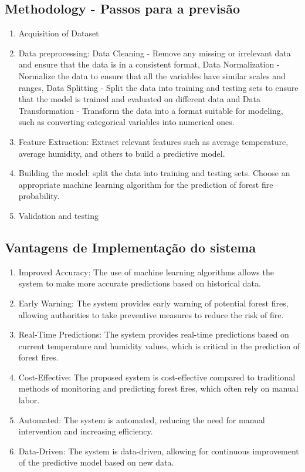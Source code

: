 \documentclass{article}
\begin{document}
\subsection{Methodology - Passos para a previsão}
\begin{enumerate}
\item Acquisition of Dataset
\item Data preprocessing: Data Cleaning - Remove any missing or irrelevant data and ensure that the data is in a consistent format, Data Normalization - Normalize the data to ensure that all the variables have similar scales and ranges, Data Splitting - Split the data into training and testing sets to ensure that the model is trained and evaluated on different data and Data Transformation - Transform the data into a format suitable for modeling, such as converting categorical variables into numerical ones.
\item Feature Extraction: Extract relevant features such as average temperature, average humidity, and others to build a predictive model.
\item Building the model: split the data into training and testing sets. Choose an appropriate machine learning
algorithm for the prediction of forest fire probability.
\item Validation and testing
\end{enumerate}

\subsection{Vantagens de Implementação do sistema}
\begin{enumerate}
    \item Improved Accuracy: The use of machine learning algorithms allows the system to make more accurate predictions based on historical data.
    \item Early Warning: The system provides early warning of potential forest fires, allowing authorities to take preventive measures to reduce the risk of fire.
    \item Real-Time Predictions: The system provides real-time predictions based on current temperature and humidity values, which is critical in the prediction of forest fires.
    \item Cost-Effective: The proposed system is cost-effective compared to traditional methods of monitoring and predicting forest fires, which often rely on manual labor.
    \item Automated: The system is automated, reducing the need for manual intervention and increasing efficiency.
    \item Data-Driven: The system is data-driven, allowing for continuous improvement of the predictive model based on new data.
\end{enumerate}
\end{document}
